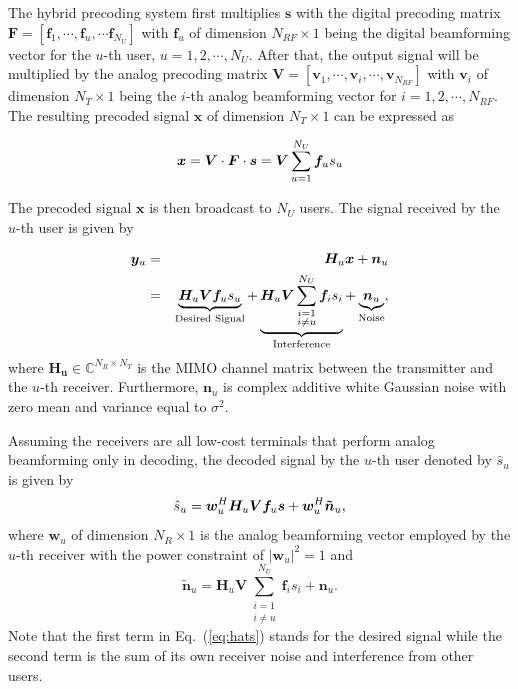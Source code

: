 \documentclass[conference]{IEEEtran}
\begin{document}
The hybrid precoding system first multiplies ${\bm s}$ with the digital precoding matrix $\bm{F}=\left[{\bm f}_1,\cdots,{\bm f}_u,\cdots{\bm f}_{N_U}\right]$ with ${\bm f}_u$ of dimension $N_{RF}\times 1$ being the digital beamforming vector for the $u$-th user, $u=1,2,\cdots,N_U$. After that, the output signal will be multiplied by the analog precoding matrix $\bm{V}=\left[{\bm v}_1,\cdots,{\bm v}_i,\cdots,{\bm v}_{N_{RF}}\right]$ with ${\bm v}_i$ of dimension $N_T\times 1$ being the $i$-th analog beamforming vector for $i=1,2,\cdots,N_{RF}$. The resulting precoded signal $\bm x$ of dimension $N_T\times 1$  can be expressed as

\begin{equation}{\label{eq:transx1}}
{\bm x} = \bm{V}\cdot \bm{F}\cdot\bm{s}= \bm{V}\sum_{u=1}^{N_U}\bm{f}_us_u
\end{equation}

The precoded signal $\bm x$ is then broadcast to $N_U$ users. The signal received by the $u$-th user is given by

\begin{eqnarray}{\label{eq:transx2}}
{\bm y}_u &=& \bm{H}_u \bm{x} + \bm{n}_u \nonumber\\
&=&\underbrace{\bm{H}_u \bm{V}\bm{f}_us_u}_\text{Desired Signal}+\underbrace{\bm{H}_u \bm{V}\sum_{\substack{i=1 \\ i\neq u}}^{N_U}\bm{f}_is_i}_\text{Interference}+\underbrace{\bm{n}_u}_\text{Noise},
\end{eqnarray}
where $\bm{H_u}$$\in\mathbb{C}^{N_R\times N_T}$ is the MIMO channel matrix between the transmitter and the $u$-th receiver\cite{el2014spatially}. Furthermore, $\bm{n}_u$ is complex additive white Gaussian noise with zero mean and variance equal to $\sigma^2$.

Assuming the receivers are all low-cost terminals that perform analog beamforming only in decoding, the decoded signal by the $u$-th user denoted by $\hat{s}_u$ is given by
\begin{equation}{\label{eq:hats}}
\hat{s}_u = \bm{w}_u^H \bm{H}_u \bm{V} \bm{f}_{u} \bm{s} + \bm{w}_u^H \bm{\tilde{n}}_u,
\end{equation}
where ${\bm w}_u$ of dimension $N_R\times 1$ is the analog beamforming vector employed by the $u$-th receiver with the power constraint of $|\bm{w}_u|^2=1$ and
\begin{equation}
\bm{\tilde{n}}_u=\bm{H}_u \bm{V}\sum_{\substack{i=1 \\ i\neq u}}^{N_U}\bm{f}_is_i+\bm{n}_u.
\end{equation}
Note that the first term in Eq.~(\ref{eq:hats}) stands for the desired signal while the second term is the sum of its own receiver noise and interference from other users.
\end{document}
